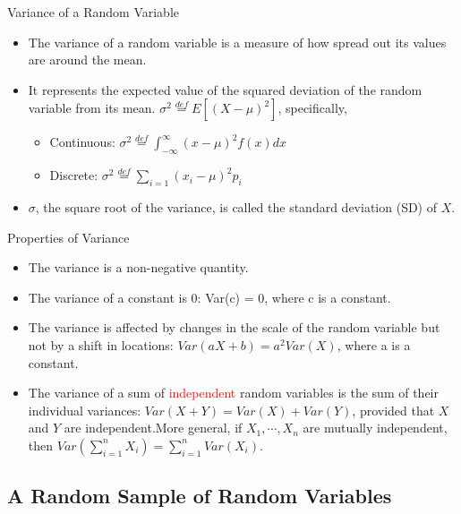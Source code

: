 \documentclass[
  ignorenonframetext,
]{beamer}
\providecommand{\tightlist}{%
  \setlength{\itemsep}{0pt}\setlength{\parskip}{0pt}}
\begin{document}
\begin{frame}{Variance of a Random Variable}
\protect\hypertarget{variance-of-a-random-variable}{}
\begin{itemize}
\tightlist
\item
  The variance of a random variable is a measure of how spread out its
  values are around the mean.
\item
  It represents the expected value of the squared deviation of the
  random variable from its mean.
  \(\sigma^2 \overset{def} = E[(X-\mu)^2]\), specifically,

  \begin{itemize}
  \tightlist
  \item
    Continuous:
    \(\sigma^2 \overset{def}= \int_{-\infty}^{\infty} (x - \mu)^2 f(x) dx\)
  \item
    Discrete:
    \(\sigma^2 \overset{def}= \sum_{i=1}^{} (x_i - \mu)^2 p_i\)
  \end{itemize}
\item
  \(\sigma\), the square root of the variance, is called the standard
  deviation (SD) of \(X\).
\end{itemize}
\end{frame}

\begin{frame}{Properties of Variance}
\protect\hypertarget{properties-of-variance}{}
\begin{itemize}
\tightlist
\item
  The variance is a non-negative quantity.
\item
  The variance of a constant is 0: Var(c) = 0, where c is a constant.
\item
  The variance is affected by changes in the scale of the random
  variable but not by a shift in locations: \(Var(aX+b) = a^2 Var(X)\),
  where a is a constant.
\item
  The variance of a sum of \textcolor{red}{independent} random variables
  is the sum of their individual variances:
  \(Var(X + Y) = Var(X) + Var(Y)\), provided that \(X\) and \(Y\) are
  independent.More general, if \(X_1,\cdots, X_n\) are mutually
  independent, then \(Var(\sum_{i=1}^n X_i)=\sum_{i=1}^n Var(X_i)\).
\end{itemize}
\end{frame}

\hypertarget{a-random-sample-of-random-variables}{%
\subsection{A Random Sample of Random
Variables}\label{a-random-sample-of-random-variables}}
\end{document}
